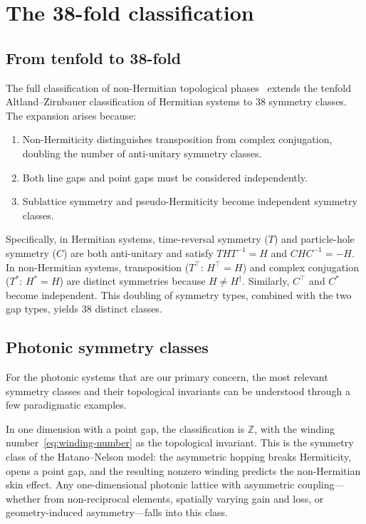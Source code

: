 \section{The 38-fold classification}
\label{sec:classification}

\subsection{From tenfold to 38-fold}
\label{ssec:tenfold-to-38}

The full classification of non-Hermitian topological
phases~\cite{kawabata2019symmetry} extends the tenfold Altland--Zirnbauer
classification of Hermitian systems to 38 symmetry classes. The
expansion arises because:
\begin{enumerate}
 \item Non-Hermiticity distinguishes transposition from complex
 conjugation, doubling the number of anti-unitary symmetry classes.
 \item Both line gaps and point gaps must be considered independently.
 \item Sublattice symmetry and pseudo-Hermiticity become independent
 symmetry classes.
\end{enumerate}

Specifically, in Hermitian systems, time-reversal symmetry ($T$) and
particle-hole symmetry ($C$) are both anti-unitary and satisfy
$T H T^{-1} = H$ and $C H C^{-1} = -H$. In non-Hermitian systems,
transposition ($T^\top$: $H^\top = H$) and complex conjugation
($T^*$: $H^* = H$) are distinct symmetries because $H \neq H^\dagger$.
Similarly, $C^\top$ and $C^*$ become independent. This doubling of
symmetry types, combined with the two gap types, yields $38$ distinct
classes.

\subsection{Photonic symmetry classes}
\label{ssec:photonic-classes}

For the photonic systems that are our primary concern, the most relevant
symmetry classes and their topological invariants can be understood
through a few paradigmatic examples.

In one dimension with a point gap, the classification is $\mathbb{Z}$,
with the winding number~\eqref{eq:winding-number} as the topological
invariant. This is the symmetry class of the Hatano--Nelson model: the
asymmetric hopping breaks Hermiticity, opens a point gap, and the
resulting nonzero winding predicts the non-Hermitian skin effect. Any
one-dimensional photonic lattice with asymmetric coupling---whether from
non-reciprocal elements, spatially varying gain and loss, or
geometry-induced asymmetry---falls into this class.

